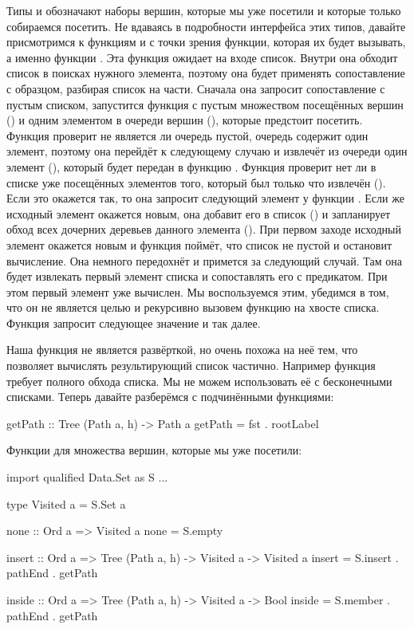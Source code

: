 Типы  и  обозначают наборы вершин,
которые мы уже посетили и которые только собираемся посетить.
Не вдаваясь в подробности интерфейса этих типов, давайте присмотримся
к функциям  и  с точки зрения функции, которая
их будет вызывать, а именно функции . Эта функция
ожидает на входе список. Внутри она обходит список в поисках
нужного элемента, поэтому она будет применять
сопоставление с образцом, разбирая список на части. 
Сначала она запросит сопоставление с пустым списком, 
запустится функция  с пустым множеством посещённых вершин
() и одним элементом в очереди вершин (), которые
предстоит посетить. Функция  проверит не является
ли очередь пустой, очередь содержит один элемент, поэтому
она перейдёт к следующему случаю и извлечёт из очереди
один элемент (), который будет передан в функцию .
Функция  проверит нет ли в списке уже посещённых
элементов того, который был только что извлечён 
(). Если это окажется так, то она 
запросит следующий элемент у функции . Если
же исходный элемент окажется новым, она добавит его в список
() и запланирует обход всех дочерних деревьев
данного элемента ().
При первом заходе исходный элемент окажется новым и функция
 поймёт, что список не пустой и остановит 
вычисление. Она немного передохнёт и примется за следующий
случай. Там она будет извлекать первый элемент списка 
и сопоставлять его с предикатом. При этом первый элемент 
уже вычислен. Мы воспользуемся этим, убедимся в том, что
он не является целью и рекурсивно вызовем функцию 
на хвосте списка. Функция  запросит следующее 
значение и так далее. 

Наша функция  не является развёрткой,
но очень похожа на неё тем, что позволяет вычислять результирующий
список частично. Например функция  требует полного
обхода списка. Мы не можем использовать её с бесконечными
списками. Теперь давайте разберёмся с подчинёнными функциями:

\begin{code}
getPath :: Tree (Path a, h) -> Path a
getPath = fst . rootLabel
\end{code}

Функции для множества вершин, которые мы уже посетили:

\begin{code}
import qualified Data.Set as S
...

type Visited a   = S.Set a

none :: Ord a => Visited a
none = S.empty

insert :: Ord a => Tree (Path a, h) -> Visited a -> Visited a
insert = S.insert . pathEnd . getPath

inside :: Ord a => Tree (Path a, h) -> Visited a -> Bool
inside = S.member . pathEnd . getPath
\end{code}

